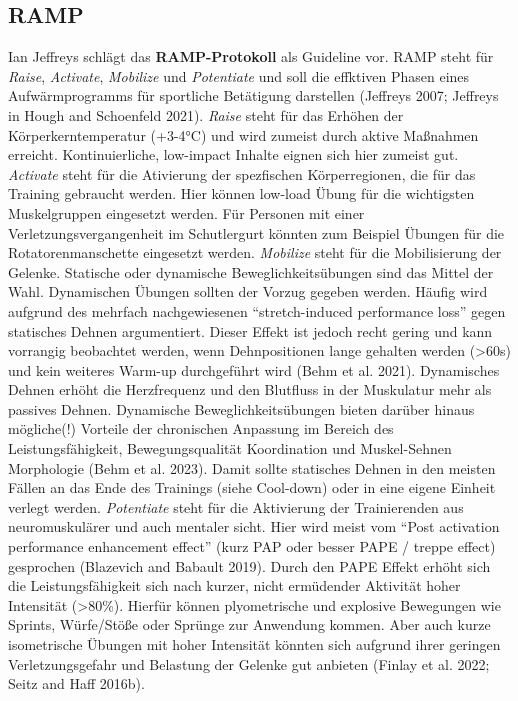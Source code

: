 \documentclass[
  letterpaper,
  DIV=11,
  numbers=noendperiod]{scrreprt}
\begin{document}
\subsection{RAMP}\label{ramp}

Ian Jeffreys schlägt das \textbf{RAMP-Protokoll} als Guideline vor. RAMP
steht für \emph{Raise}, \emph{Activate}, \emph{Mobilize} und
\emph{Potentiate} und soll die effktiven Phasen eines Aufwärmprogramms
für sportliche Betätigung darstellen (Jeffreys 2007; Jeffreys in Hough
and Schoenfeld 2021). \emph{Raise} steht für das Erhöhen der
Körperkerntemperatur (+3-4°C) und wird zumeist durch aktive Maßnahmen
erreicht. Kontinuierliche, low-impact Inhalte eignen sich hier zumeist
gut. \emph{Activate} steht für die Ativierung der spezfischen
Körperregionen, die für das Training gebraucht werden. Hier können
low-load Übung für die wichtigsten Muskelgruppen eingesetzt werden. Für
Personen mit einer Verletzungsvergangenheit im Schutlergurt könnten zum
Beispiel Übungen für die Rotatorenmanschette eingesetzt werden.
\emph{Mobilize} steht für die Mobilisierung der Gelenke. Statische oder
dynamische Beweglichkeitsübungen sind das Mittel der Wahl. Dynamischen
Übungen sollten der Vorzug gegeben werden. Häufig wird aufgrund des
mehrfach nachgewiesenen ``stretch-induced performance loss'' gegen
statisches Dehnen argumentiert. Dieser Effekt ist jedoch recht gering
und kann vorrangig beobachtet werden, wenn Dehnpositionen lange gehalten
werden (\textgreater60s) und kein weiteres Warm-up durchgeführt wird
(Behm et al. 2021). Dynamisches Dehnen erhöht die Herzfrequenz und den
Blutfluss in der Muskulatur mehr als passives Dehnen. Dynamische
Beweglichkeitsübungen bieten darüber hinaus mögliche(!) Vorteile der
chronischen Anpassung im Bereich des Leistungsfähigkeit,
Bewegungsqualität Koordination und Muskel-Sehnen Morphologie (Behm et
al. 2023). Damit sollte statisches Dehnen in den meisten Fällen an das
Ende des Trainings (siehe Cool-down) oder in eine eigene Einheit verlegt
werden. \emph{Potentiate} steht für die Aktivierung der Trainierenden
aus neuromuskulärer und auch mentaler sicht. Hier wird meist vom ``Post
activation performance enhancement effect'' (kurz PAP oder besser PAPE /
treppe effect) gesprochen (Blazevich and Babault 2019). Durch den PAPE
Effekt erhöht sich die Leistungsfähigkeit sich nach kurzer, nicht
ermüdender Aktivität hoher Intensität (\textgreater80\%). Hierfür können
plyometrische und explosive Bewegungen wie Sprints, Würfe/Stöße oder
Sprünge zur Anwendung kommen. Aber auch kurze isometrische Übungen mit
hoher Intensität könnten sich aufgrund ihrer geringen Verletzungsgefahr
und Belastung der Gelenke gut anbieten (Finlay et al. 2022; Seitz and
Haff 2016b).
\end{document}

